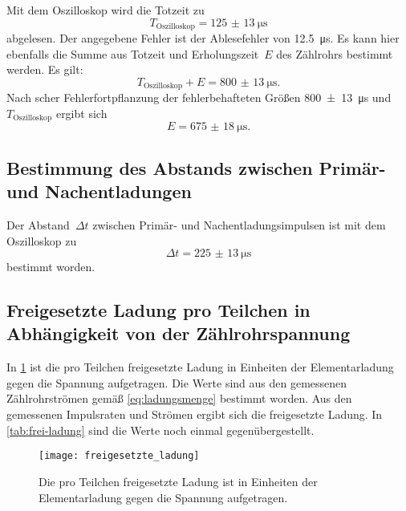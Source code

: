 Mit dem Oszilloskop wird die Totzeit zu
\begin{equation}
  T_\text{Oszilloskop} = \SI{125(13)}{\micro\second}
\end{equation}
abgelesen. Der angegebene Fehler ist der Ablesefehler von
\SI{12.5}{\micro\second}. Es kann hier ebenfalls die Summe aus Totzeit
und Erholungszeit~$E$ des Zählrohrs bestimmt werden. Es gilt:
\begin{equation}
  T_\text{Oszilloskop} + E = \SI{800(13)}{\micro\second}.
\end{equation}
Nach scher Fehlerfortpflanzung der fehlerbehafteten Größen
\SI{800(13)}{\micro\second} und $T_\text{Oszilloskop}$ ergibt sich
\begin{equation}
    E = \SI{675(18)}{\micro\second}.
\end{equation}

\subsection{Bestimmung des Abstands zwischen Primär- und
  Nachentladungen}

Der Abstand~$\Delta t$ zwischen Primär- und Nachentladungsimpulsen ist mit dem
Oszilloskop zu
%
\begin{equation}
  \Delta t = \SI{225(13)}{\micro\second}
\end{equation}
%
bestimmt worden.

\subsection{Freigesetzte Ladung pro Teilchen in Abhängigkeit von der
  Zählrohrspannung}

In \cref{fig:freigesetzte_ladung} ist die pro Teilchen freigesetzte
Ladung in Einheiten der Elementarladung gegen die Spannung aufgetragen.
Die Werte sind aus den gemessenen Zählrohrströmen gemäß
\cref{eq:ladungsmenge} bestimmt worden. Aus den gemessenen Impulsraten
und Strömen ergibt sich die freigesetzte Ladung. In
\cref{tab:frei-ladung} sind die Werte noch einmal gegenübergestellt.

\begin{figure}
  \centering
  \texttt{[image: freigesetzte\_ladung]}
    \caption{Die pro Teilchen freigesetzte Ladung ist in Einheiten der
      Elementarladung gegen die Spannung aufgetragen.}
  \label{fig:freigesetzte_ladung}
\end{figure}

